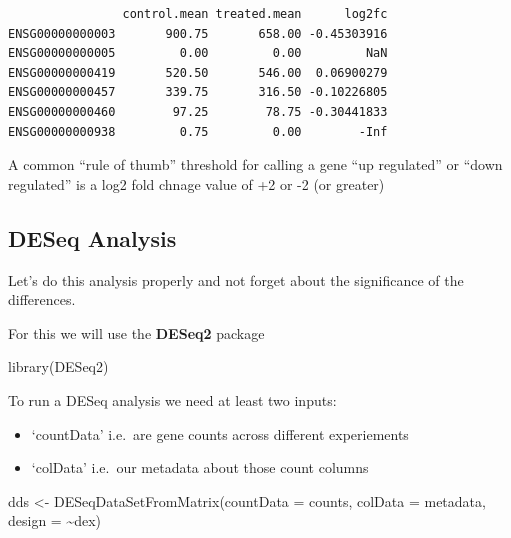 \documentclass[
  letterpaper,
  DIV=11,
  numbers=noendperiod]{scrartcl}
\newenvironment{Shaded}{\begin{snugshade}}{\end{snugshade}}
\newcommand{\AttributeTok}[1]{\textcolor[rgb]{0.40,0.45,0.13}{#1}}
\newcommand{\FunctionTok}[1]{\textcolor[rgb]{0.28,0.35,0.67}{#1}}
\newcommand{\NormalTok}[1]{\textcolor[rgb]{0.00,0.23,0.31}{#1}}
\newcommand{\OtherTok}[1]{\textcolor[rgb]{0.00,0.23,0.31}{#1}}
\newcommand{\SpecialCharTok}[1]{\textcolor[rgb]{0.37,0.37,0.37}{#1}}
\providecommand{\tightlist}{%
  \setlength{\itemsep}{0pt}\setlength{\parskip}{0pt}}
\begin{document}
\begin{Shaded}
\end{Shaded}

\begin{verbatim}
                control.mean treated.mean      log2fc
ENSG00000000003       900.75       658.00 -0.45303916
ENSG00000000005         0.00         0.00         NaN
ENSG00000000419       520.50       546.00  0.06900279
ENSG00000000457       339.75       316.50 -0.10226805
ENSG00000000460        97.25        78.75 -0.30441833
ENSG00000000938         0.75         0.00        -Inf
\end{verbatim}

A common ``rule of thumb'' threshold for calling a gene ``up regulated''
or ``down regulated'' is a log2 fold chnage value of +2 or -2 (or
greater)

\subsection{DESeq Analysis}\label{deseq-analysis}

Let's do this analysis properly and not forget about the significance of
the differences.

For this we will use the \textbf{DESeq2} package

\begin{Shaded}
\begin{Highlighting}[]
\FunctionTok{library}\NormalTok{(DESeq2)}
\end{Highlighting}
\end{Shaded}

To run a DESeq analysis we need at least two inputs:

\begin{itemize}
\tightlist
\item
  `countData' i.e.~are gene counts across different experiements
\item
  `colData' i.e.~our metadata about those count columns
\end{itemize}

\begin{Shaded}
\begin{Highlighting}[]
\NormalTok{dds }\OtherTok{\textless{}{-}} \FunctionTok{DESeqDataSetFromMatrix}\NormalTok{(}\AttributeTok{countData =}\NormalTok{ counts,}
                              \AttributeTok{colData =}\NormalTok{ metadata,}
                              \AttributeTok{design =} \SpecialCharTok{\textasciitilde{}}\NormalTok{dex)}
\end{Highlighting}
\end{Shaded}
\end{document}
